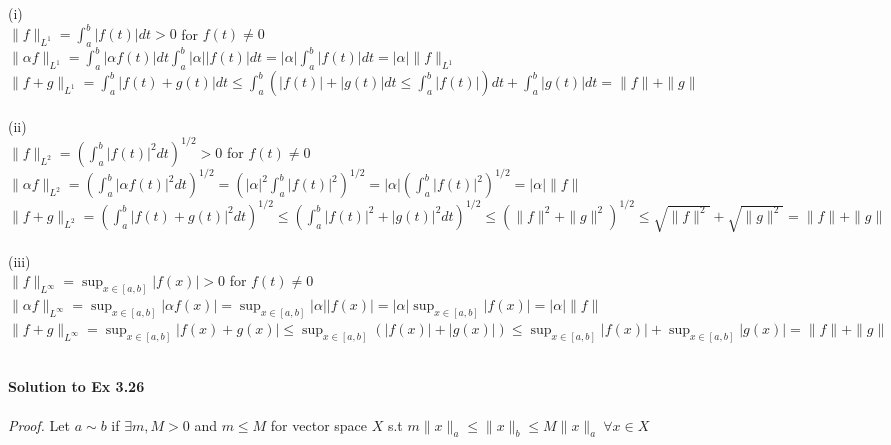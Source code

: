 \documentclass[letterpaper,12pt]{article}
\theoremstyle{definition}
\begin{document}
\begin{spacing}{1.3}{}
	\setlength{\leftskip}{20pt}
	(i) \\
	
	$\|f\|_{L^{1}} = \int_{a}^{b} |f(t)|dt >0$ for $f(t) \neq 0$ \\
	
	$\|\alpha f\|_{L^{1}} = \int_{a}^{b} |\alpha f(t)|dt \int_{a}^{b} |\alpha| |f(t)|dt = |\alpha| \int_{a}^{b} |f(t)|dt = |\alpha| \|f\|_{L^{1}}$ \\
	
	$\|f+g\|_{L^{1}} = \int_{a}^{b} |f(t)+g(t)|dt \leq \int_{a}^{b} (|f(t)|+|g(t)|dt \leq \int_{a}^{b}|f(t)|)dt + \int_{a}^{b}|      g(t)|dt                             = \|f\| + \|g\| $ \\\\
	
	(ii) \\
	
	$\|f\|_{L^{2}} = (\int_{a}^{b} |f(t)|^{2}dt)^{1/2} >0$ for $f(t) \neq 0$ \\
	
	$\|\alpha f\|_{L^{2}} = (\int_{a}^{b} |\alpha f(t)|^{2}dt)^{1/2} = ( |\alpha|^2 \int_{a}^{b} |f(t)|^{2})^{1/2} = |\alpha|(\int_{a}^{b} |f(t)|^{2})^{1/2} = |\alpha| \|f\| $\\
	
	$\|f+g\|_{L^{2}} = (\int_{a}^{b} |f(t)+g(t)|^2 dt)^{1/2} \leq (\int_{a}^{b} |f(t)|^2+|g(t)|^2 dt)^{1/2} \leq
             (\|f\|^2 + \|g\|^2)^{1/2} \leq \sqrt{\|f\|^2} + \sqrt{\|g\|^2} = \|f\|+\|g\|  $ \\\\
	
	(iii) \\
	
	$\|f\|_{L^{\infty}} = \sup_{x \in [a,b]} |f(x)| >0$ for $f(t) \neq 0$ \\
	
	$\|\alpha f\|_{L^{\infty}} = \sup_{x \in [a,b]} |\alpha f(x)| = \sup_{x \in [a,b]} |\alpha| |f(x)| = |\alpha| \sup_{x \in [a,b]} |f(x)| = |\alpha| \|f\|$\\
	
	$\|f+g\|_{L^{\infty}} = \sup_{x \in [a,b]} |f(x)+g(x)| \leq \sup_{x \in [a,b]} (|f(x)|+|g(x)|) \leq \sup_{x \in [a,b]} |f(x)| + \sup_{x \in [a,b]} |g(x)| = \|f\| + \|g\| $ \\\\
	
	
	\setlength{\leftskip}{10pt}
	
	\textbf{Solution to Ex 3.26} \\\\
	\emph{Proof.} Let $a \sim b$ if $\exists m,M > 0$ and $m \leq M$ for vector space $X$ s.t $m \|x\|_{a} \leq \|x\|_{b} \leq M \|x\|_{a} \ \forall x \in X$ \\\\
	

\end{spacing}
\end{document}
